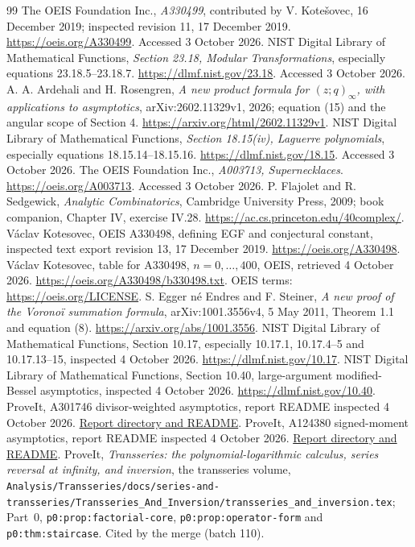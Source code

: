 \documentclass[11pt]{article}
\theoremstyle{definition}\newtheorem{definition}[theorem]{Definition}
\theoremstyle{remark}\newtheorem{remark}[theorem]{Remark}
\newcommand{\file}[1]{\nolinkurl{#1}}
\begin{document}
\clearpage
\begin{thebibliography}{99}
The OEIS Foundation Inc., \emph{A330499}, contributed by V. Kote\v{s}ovec,
16 December 2019; inspected revision 11, 17 December 2019.
\url{https://oeis.org/A330499}. Accessed 3 October 2026.
NIST Digital Library of Mathematical Functions, \emph{Section 23.18,
Modular Transformations}, especially equations 23.18.5--23.18.7.
\url{https://dlmf.nist.gov/23.18}. Accessed 3 October 2026.
A. A. Ardehali and H. Rosengren, \emph{A new product formula for
$(z;q)_\infty$, with applications to asymptotics}, arXiv:2602.11329v1,
2026; equation (15) and the angular scope of Section 4.
\url{https://arxiv.org/html/2602.11329v1}.
NIST Digital Library of Mathematical Functions, \emph{Section 18.15(iv),
Laguerre polynomials}, especially equations 18.15.14--18.15.16.
\url{https://dlmf.nist.gov/18.15}. Accessed 3 October 2026.
The OEIS Foundation Inc., \emph{A003713, Supernecklaces}.
\url{https://oeis.org/A003713}. Accessed 3 October 2026.
P. Flajolet and R. Sedgewick, \emph{Analytic Combinatorics}, Cambridge
University Press, 2009; book companion, Chapter IV, exercise IV.28.
\url{https://ac.cs.princeton.edu/40complex/}.
 V\'aclav Kotesovec, OEIS A330498, defining EGF and
conjectural constant, inspected text export revision 13,
17 December 2019. \url{https://oeis.org/A330498}.
 V\'aclav Kotesovec, table for A330498, $n=0,\ldots,400$,
OEIS, retrieved 4 October 2026.
\url{https://oeis.org/A330498/b330498.txt}.
OEIS terms: \url{https://oeis.org/LICENSE}.
 S. Egger n\'e Endres and F. Steiner,
\emph{A new proof of the Vorono\"i summation formula},
arXiv:1001.3556v4, 5 May 2011, Theorem 1.1 and equation (8).
\url{https://arxiv.org/abs/1001.3556}.
 NIST Digital Library of Mathematical Functions,
Section 10.17, especially 10.17.1, 10.17.4--5 and
10.17.13--15, inspected 4 October 2026.
\url{https://dlmf.nist.gov/10.17}.
 NIST Digital Library of Mathematical Functions,
Section 10.40, large-argument modified-Bessel asymptotics,
inspected 4 October 2026. \url{https://dlmf.nist.gov/10.40}.
 ProveIt, A301746 divisor-weighted asymptotics,
report README inspected 4 October 2026.
\href{https://github.com/VladimirReshetnikov/ProveIt/tree/main/SetTheory/Cardinals/docs/reports/generating-functions-and-asymptotics/oeis-sequence-asymptotics/a301746-divisor-weighted-asymptotics}{Report directory and README}.
 ProveIt, A124380 signed-moment asymptotics,
report README inspected 4 October 2026.
\href{https://github.com/VladimirReshetnikov/ProveIt/tree/main/SetTheory/Cardinals/docs/reports/generating-functions-and-asymptotics/oeis-sequence-asymptotics/a124380-signed-moment-asymptotics}{Report directory and README}.
 ProveIt, \emph{Transseries: the polynomial-logarithmic calculus, series reversal at infinity, and inversion}, the transseries volume, \file{Analysis/Transseries/docs/series-and-transseries/Transseries_And_Inversion/transseries_and_inversion.tex}; Part~0, \file{p0:prop:factorial-core}, \file{p0:prop:operator-form} and \file{p0:thm:staircase}. Cited by the merge (batch 110).
\end{thebibliography}
\end{document}
